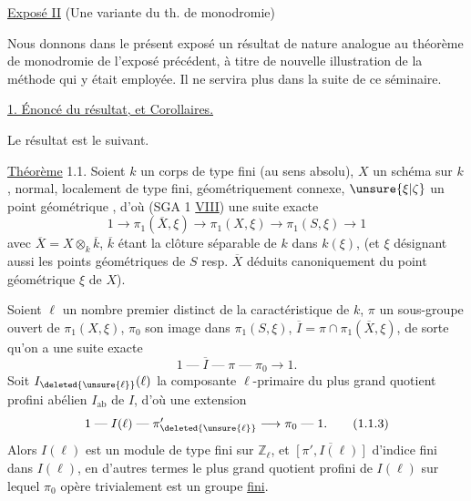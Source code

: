 \uline{Exposé II}  (Une variante du th. de monodromie) 

Nous donnons dans le  présent exposé un résultat de nature analogue au théorème de monodromie de l'exposé précédent,  à titre de nouvelle illustration de la méthode qui y était employée. Il ne servira plus dans la suite de ce séminaire.

\uline{1. Énoncé du résultat, et Corollaires.}

 Le résultat   est le suivant.

\uline{Théorème} 1.1. Soient $k$ un corps   de type fini (au sens absolu), $X$ un schéma sur  $k$, normal, localement de type fini,  géométriquement connexe, $\unsure{\xi|\zeta}$ un point géométrique , d'où (SGA 1 \uline{VIII}) une suite exacte
\[
1\longrightarrow\pi_1(\overline X,\xi)\longrightarrow\pi_1(X,\xi)\longrightarrow\pi_1(S,\xi)\longrightarrow1
\tag*{(1.1.1)}
\]
avec  $\overline X=X\otimes_k\overline k$, $\overline k$ étant la clôture séparable de $k$ dans $k(\xi)$, (et $\xi$ désignant aussi les points géométriques de $S$ resp. $\overline X$ déduits canoniquement du \deleted{\unsure{$\xi$}} point géométrique $\xi$ de $X$). 

 Soient $\ell$ un nombre premier distinct de la caractéristique de $k$,  $\pi$ un sous-groupe ouvert de $\pi_1(X,\xi)$, $\pi_0$ son image dans $\pi_1(S,\xi)$, $\overline I=\pi\cap\pi_1(\overline X,\xi)$, de sorte qu'on a une suite exacte
\[
1\mathrel{\text{---}}\overline I\mathrel{\text{---}}\pi\mathrel{\text{---}}\pi_0\longrightarrow1.
\tag*{(1.1.2)}
\]
Soit $I_{\deleted{\unsure{\ell}}}(\ell)$ la composante $\ell$-primaire du plus grand quotient profini abélien $I_{\mathrm{ab}}$ de $I$,  d'où  une extension
\[
1\mathrel{\text{---}}I(\ell)\mathrel{\text{---}}\pi'_{\deleted{\unsure{\ell}}}\longrightarrow\pi_0\mathrel{\text{---}}1.
\tag*{(1.1.3)}
\]
Alors  $I(\ell)$ est un module de type fini sur $\mathbb{Z}_\ell$, et $\overline{[\pi',I(\ell)]}$  d'indice fini dans $I(\ell)$, en d'autres termes  le plus grand quotient profini de $I(\ell)$ sur lequel $\pi_0$ opère trivialement est un groupe \uline{fini}.
